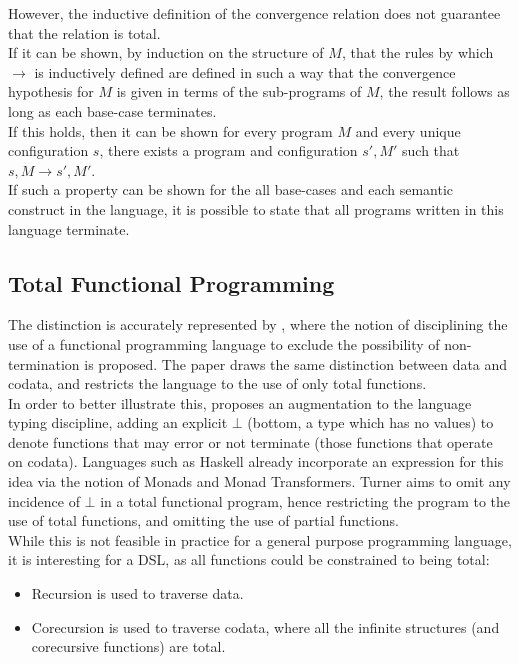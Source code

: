 \documentclass[a4paper,11pt]{report}
\begin{document}
However, the inductive definition of the convergence relation does not guarantee that the relation is total.\\

If it can be shown, by induction on the structure of $M$, that the rules by which $\rightarrow$ is inductively defined are defined in such a way that the convergence hypothesis for $M$ is given in terms of the sub-programs of $M$, the result follows as long as each base-case terminates. \\

If this holds, then it can be shown for every program $M$ and every unique configuration $s$, there exists a program and configuration $s', M'$ such that $s, M \rightarrow s', M'$.\\

If such a property can be shown for the all base-cases and each semantic construct in the language, it is possible to state that all programs written in this language terminate. 


\subsection{Total Functional Programming} %
\label{sub:total_functional_programming}
The distinction is accurately represented by \citet{turner2004total}, where the notion of disciplining the use of a functional programming language to exclude the possibility of non-termination is proposed. 
The paper draws the same distinction between data and codata, and restricts the language to the use of only total functions. \\

In order to better illustrate this, \citet{turner2004total} proposes an augmentation to the language typing discipline, adding an explicit $\bot$ (bottom, a type which has no values) to denote functions that may error or not terminate (those functions that operate on codata). 
Languages such as Haskell already incorporate an expression for this idea via the notion of Monads and Monad Transformers.
Turner aims to omit any incidence of $\bot$ in a total functional program, hence restricting the program to the use of total functions, and omitting the use of partial functions. \\

While this is not feasible in practice for a general purpose programming language, it is interesting for a DSL, as all functions could be constrained to being total:
\begin{itemize}
    \item Recursion is used to traverse data.
    \item Corecursion is used to traverse codata, where all the infinite structures (and corecursive functions) are total. 
\end{itemize}
\end{document}
